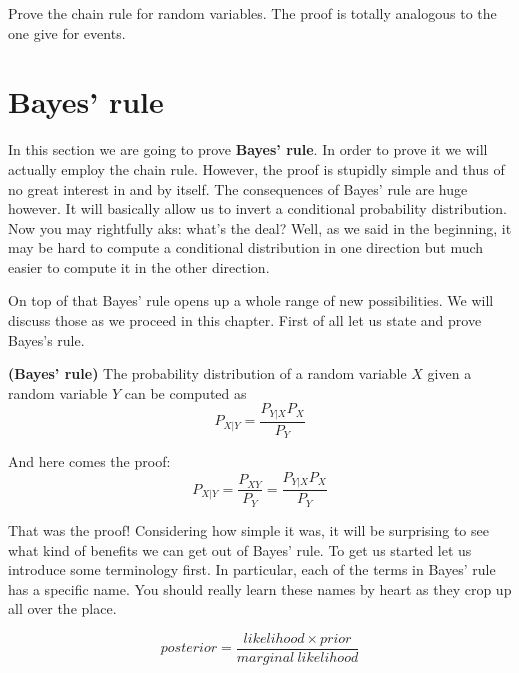 \documentclass[a4paper,11pt,leqno]{report}
\begin{document}
\begin{Exercise}
Prove the chain rule for random variables. The proof is totally analogous to the one give for events.
\end{Exercise}

\section{Bayes' rule}

In this section we are going to prove \textbf{Bayes' rule}. In order to prove it we will actually employ the chain rule.
However, the proof is stupidly simple and thus of no great interest in and by itself. The consequences of Bayes' rule
are huge however. It will basically allow us to invert a conditional probability distribution. Now you may rightfully
aks: what's the deal? Well, as we said in the beginning, it may be hard to compute a conditional distribution in one
direction but much easier to compute it in the other direction.

On top of that Bayes' rule opens up a whole range of new possibilities. We will discuss those as we proceed in this
chapter. First of all let us state and prove Bayes's rule.
\begin{Theorem}{\textbf{(Bayes' rule)}}
The probability distribution of a random variable $ X $ given a random variable $ Y $ can be computed as
$$ P_{X|Y} = \dfrac{P_{Y|X}P_{X}}{P_{Y}} $$
\end{Theorem}

And here comes the proof:
\begin{equation}
P_{X|Y} = \dfrac{P_{XY}}{P_{Y}} = \dfrac{P_{Y|X}P_{X}}{P_{Y}}
\end{equation}

That was the proof! Considering how simple it was, it will be surprising to see what kind of benefits we can get out
of Bayes' rule. To get us started let us introduce some terminology first. In particular, each of the terms
in Bayes' rule has a specific name. You should really learn these names by heart as they crop up all over the place.

$$ posterior = \dfrac{likelihood \times prior}{marginal~likelihood} $$
\end{document}
